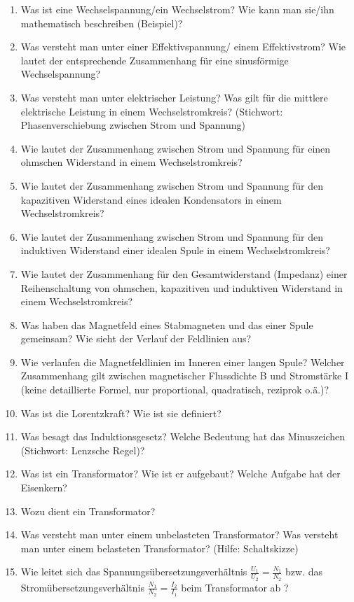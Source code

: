 \begin{enumerate}
	\item Was ist eine Wechselspannung/ein Wechselstrom? Wie kann man sie/ihn mathematisch beschreiben (Beispiel)?
	\item Was versteht man unter einer Effektivspannung/ einem Effektivstrom? Wie lautet der entsprechende Zusammenhang für eine sinusförmige Wechselspannung?
	\item Was versteht man unter elektrischer Leistung? Was gilt für die mittlere elektrische Leistung in einem Wechselstromkreis? (Stichwort: Phasenverschiebung zwischen Strom und Spannung)
	\item Wie lautet der Zusammenhang zwischen Strom und Spannung für einen ohmschen Widerstand in einem Wechselstromkreis?
	\item Wie lautet der Zusammenhang zwischen Strom und Spannung für den kapazitiven Widerstand eines idealen Kondensators in einem Wechselstromkreis?
	\item Wie lautet der Zusammenhang zwischen Strom und Spannung für den induktiven Widerstand einer idealen Spule in einem Wechselstromkreis?
	\item Wie lautet der Zusammenhang für den Gesamtwiderstand (Impedanz) einer Reihenschaltung von ohmschen, kapazitiven und induktiven Widerstand in einem Wechselstromkreis?
	\item Was haben das Magnetfeld eines Stabmagneten und das einer Spule gemeinsam? Wie sieht der Verlauf der Feldlinien aus?
	\item Wie verlaufen die Magnetfeldlinien im Inneren einer langen Spule? Welcher Zusammenhang gilt zwischen magnetischer Flussdichte B und Stromstärke I (keine detaillierte Formel, nur proportional, quadratisch, reziprok o.ä.)?
	\item Was ist die Lorentzkraft? Wie ist sie definiert?
	\item Was besagt das Induktionsgesetz? Welche Bedeutung hat das Minuszeichen (Stichwort: Lenzsche Regel)?
	\item Was ist ein Transformator? Wie ist er aufgebaut? Welche Aufgabe hat der Eisenkern?
	\item Wozu dient ein Transformator?
	\item Was versteht man unter einem unbelasteten Transformator? Was versteht man unter einem belasteten Transformator? (Hilfe: Schaltskizze)
	\item Wie leitet sich das Spannungsübersetzungsverhältnis $\frac{U_1}{U_2}=\frac{N_1}{N_2}$ bzw. das Stromübersetzungsverhältnis $\frac{N_1}{N_2}=\frac{I_2}{I_1}$ beim Transformator ab ?
\end{enumerate}

